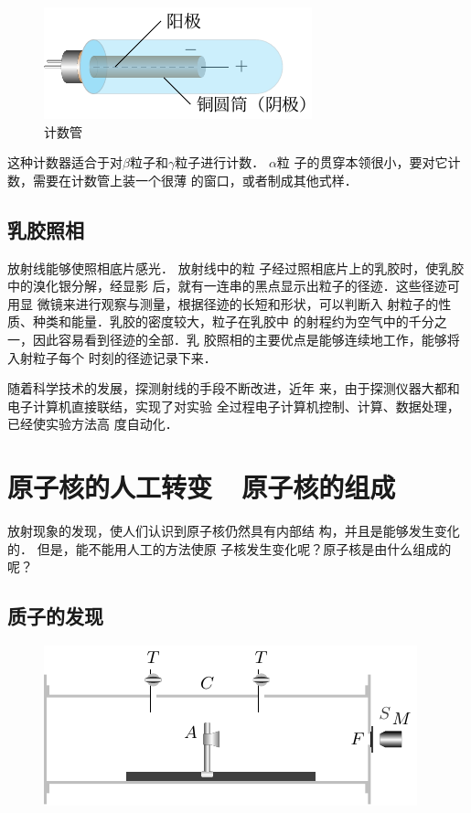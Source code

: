 \begin{figure}[htbp]
	\centering
	\includegraphics{fig/C/9-4.pdf}
	\caption{计数管}\label{fig_C_9-4}
\end{figure}

这种计数器适合于对$\beta$粒子和$\gamma$粒子进行计数．
$\alpha$粒
子的贯穿本领很小，要对它计数，需要在计数管上装一个很薄
的窗口，或者制成其他式样．

\subsection{乳胶照相}

放射线能够使照相底片感光．
放射线中的粒
子经过照相底片上的乳胶时，使乳胶中的溴化银分解，经显影
后，就有一连串的黑点显示出粒子的径迹．这些径迹可用显
微镜来进行观察与测量，根据径迹的长短和形状，可以判断入
射粒子的性质、种类和能量．乳胶的密度较大，粒子在乳胶中
的射程约为空气中的千分之一，因此容易看到径迹的全部．乳
胶照相的主要优点是能够连续地工作，能够将入射粒子每个
时刻的径迹记录下来．

随着科学技术的发展，探测射线的手段不断改进，近年
来，由于探测仪器大都和电子计算机直接联结，实现了对实验
全过程电子计算机控制、计算、数据处理，已经使实验方法高
度自动化．

\section{原子核的人工转变~~原子核的组成}
放射现象的发现，使人们认识到原子核仍然具有内部结
构，并且是能够发生变化的．
但是，能不能用人工的方法使原
子核发生变化呢？原子核是由什么组成的呢？

\subsection{质子的发现}
\begin{figure}[htbp]
    \centering
    \includegraphics{fig/C/9-5.pdf}
    \caption{}\label{fig_C_9-5}
\end{figure}


